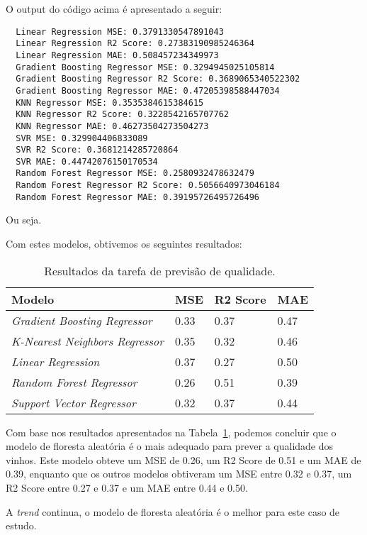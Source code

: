 \documentclass{article}
\begin{document}
O output do código acima é apresentado a seguir:

\begin{verbatim}
  Linear Regression MSE: 0.3791330547891043
  Linear Regression R2 Score: 0.27383190985246364
  Linear Regression MAE: 0.508457234349973
  Gradient Boosting Regressor MSE: 0.3294945025105814
  Gradient Boosting Regressor R2 Score: 0.3689065340522302
  Gradient Boosting Regressor MAE: 0.47205398588447034
  KNN Regressor MSE: 0.3535384615384615
  KNN Regressor R2 Score: 0.3228542165707762
  KNN Regressor MAE: 0.46273504273504273
  SVR MSE: 0.329904406833089
  SVR R2 Score: 0.3681214285720864
  SVR MAE: 0.44742076150170534
  Random Forest Regressor MSE: 0.2580932478632479
  Random Forest Regressor R2 Score: 0.5056640973046184
  Random Forest Regressor MAE: 0.39195726495726496
\end{verbatim}

Ou seja.

Com estes modelos, obtivemos os seguintes resultados:

\begin{table}[ht]
  \centering
  \begin{tabular}{@{}llll@{}}
    \toprule
    Modelo & MSE & R2 Score & MAE \\ \midrule
    \textit{Gradient Boosting Regressor} & 0.33 & 0.37 & 0.47 \\
    \textit{K-Nearest Neighbors Regressor} & 0.35 & 0.32 & 0.46 \\
    \textit{Linear Regression} & 0.37 & 0.27 & 0.50 \\
    \textit{Random Forest Regressor} & 0.26 & 0.51 & 0.39 \\
    \textit{Support Vector Regressor} & 0.32 & 0.37 & 0.44 \\ \bottomrule
  \end{tabular}
  \caption{Resultados da tarefa de previsão de qualidade.}
  \label{tab:task3_results}
\end{table}

Com base nos resultados apresentados na Tabela~\ref{tab:task3_results}, podemos concluir que o modelo de floresta aleatória é o mais adequado para prever a qualidade dos vinhos. Este modelo obteve um MSE de 0.26, um R2 Score de 0.51 e um MAE de 0.39, enquanto que os outros modelos obtiveram um MSE entre 0.32 e 0.37, um R2 Score entre 0.27 e 0.37 e um MAE entre 0.44 e 0.50.

A \textit{trend} continua, o modelo de floresta aleatória é o melhor para este caso de estudo.
\end{document}
